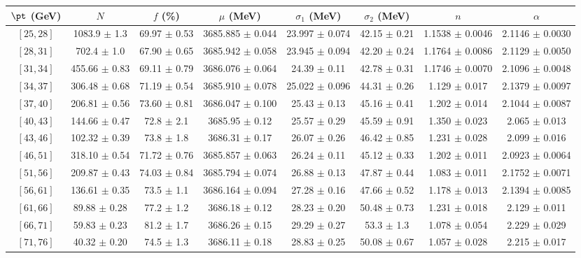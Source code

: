 \begin{tabular}{c||c|c|c|c|c|c|c}
$\pt$ (GeV) & $N$ & $f$ (\%) & $\mu$ (MeV) & $\sigma_1$ (MeV) & $\sigma_2$ (MeV) & $n$ & $\alpha$ \\
\hline
$[25, 28]$ & 1083.9 $\pm$ 1.3 & 69.97 $\pm$ 0.53 & 3685.885 $\pm$ 0.044 & 23.997 $\pm$ 0.074 & 42.15 $\pm$ 0.21 & 1.1538 $\pm$ 0.0046 & 2.1146 $\pm$ 0.0030\\
$[28, 31]$ & 702.4 $\pm$ 1.0 & 67.90 $\pm$ 0.65 & 3685.942 $\pm$ 0.058 & 23.945 $\pm$ 0.094 & 42.20 $\pm$ 0.24 & 1.1764 $\pm$ 0.0086 & 2.1129 $\pm$ 0.0050\\
$[31, 34]$ & 455.66 $\pm$ 0.83 & 69.11 $\pm$ 0.79 & 3686.076 $\pm$ 0.064 & 24.39 $\pm$ 0.11 & 42.78 $\pm$ 0.31 & 1.1746 $\pm$ 0.0070 & 2.1096 $\pm$ 0.0048\\
$[34, 37]$ & 306.48 $\pm$ 0.68 & 71.19 $\pm$ 0.54 & 3685.910 $\pm$ 0.078 & 25.022 $\pm$ 0.096 & 44.31 $\pm$ 0.26 & 1.129 $\pm$ 0.017 & 2.1379 $\pm$ 0.0097\\
$[37, 40]$ & 206.81 $\pm$ 0.56 & 73.60 $\pm$ 0.81 & 3686.047 $\pm$ 0.100 & 25.43 $\pm$ 0.13 & 45.16 $\pm$ 0.41 & 1.202 $\pm$ 0.014 & 2.1044 $\pm$ 0.0087\\
$[40, 43]$ & 144.66 $\pm$ 0.47 & 72.8 $\pm$ 2.1 & 3685.95 $\pm$ 0.12 & 25.57 $\pm$ 0.29 & 45.59 $\pm$ 0.91 & 1.350 $\pm$ 0.023 & 2.065 $\pm$ 0.013\\
$[43, 46]$ & 102.32 $\pm$ 0.39 & 73.8 $\pm$ 1.8 & 3686.31 $\pm$ 0.17 & 26.07 $\pm$ 0.26 & 46.42 $\pm$ 0.85 & 1.231 $\pm$ 0.028 & 2.099 $\pm$ 0.016\\
$[46, 51]$ & 318.10 $\pm$ 0.54 & 71.72 $\pm$ 0.76 & 3685.857 $\pm$ 0.063 & 26.24 $\pm$ 0.11 & 45.12 $\pm$ 0.33 & 1.202 $\pm$ 0.011 & 2.0923 $\pm$ 0.0064\\
$[51, 56]$ & 209.87 $\pm$ 0.43 & 74.03 $\pm$ 0.84 & 3685.794 $\pm$ 0.074 & 26.88 $\pm$ 0.13 & 47.87 $\pm$ 0.44 & 1.083 $\pm$ 0.011 & 2.1752 $\pm$ 0.0071\\
$[56, 61]$ & 136.61 $\pm$ 0.35 & 73.5 $\pm$ 1.1 & 3686.164 $\pm$ 0.094 & 27.28 $\pm$ 0.16 & 47.66 $\pm$ 0.52 & 1.178 $\pm$ 0.013 & 2.1394 $\pm$ 0.0085\\
$[61, 66]$ & 89.88 $\pm$ 0.28 & 77.2 $\pm$ 1.2 & 3686.18 $\pm$ 0.12 & 28.23 $\pm$ 0.20 & 50.48 $\pm$ 0.73 & 1.231 $\pm$ 0.018 & 2.129 $\pm$ 0.011\\
$[66, 71]$ & 59.83 $\pm$ 0.23 & 81.2 $\pm$ 1.7 & 3686.26 $\pm$ 0.15 & 29.29 $\pm$ 0.27 & 53.3 $\pm$ 1.3 & 1.078 $\pm$ 0.054 & 2.229 $\pm$ 0.029\\
$[71, 76]$ & 40.32 $\pm$ 0.20 & 74.5 $\pm$ 1.3 & 3686.11 $\pm$ 0.18 & 28.83 $\pm$ 0.25 & 50.08 $\pm$ 0.67 & 1.057 $\pm$ 0.028 & 2.215 $\pm$ 0.017\\

\end{tabular}
